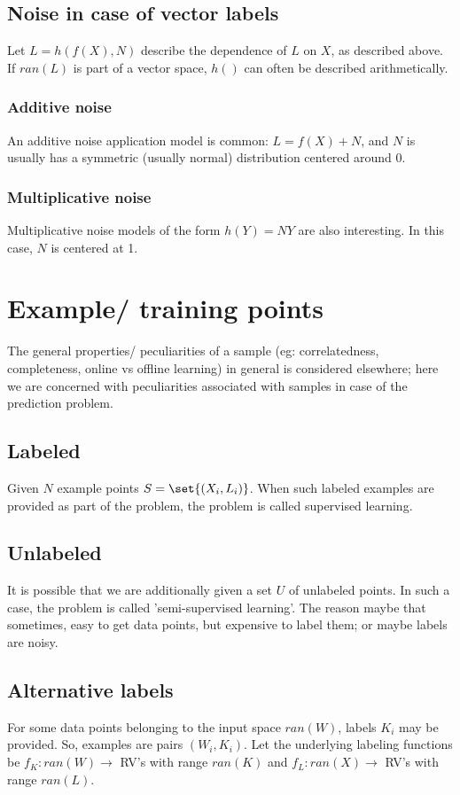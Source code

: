 \documentclass[oneside, article]{memoir}
\begin{document}
\subsection{Noise in case of vector labels}
Let $L = h(f(X), N)$ describe the dependence of $L$ on $X$, as described above. If $ran(L)$ is part of a vector space, $h()$ can often be described arithmetically.

\subsubsection{Additive noise}
An additive noise application model is common: $L = f(X) + N$, and $N$ is usually has a symmetric (usually normal) distribution centered around $0$.

\subsubsection{Multiplicative noise}
Multiplicative noise models of the form $h(Y) = NY$ are also interesting. In this case, $N$ is centered at 1.

\section{Example/ training points}
The general properties/ peculiarities of a sample (eg: correlatedness, completeness, online vs offline learning) in general is considered elsewhere; here we are concerned with peculiarities associated with samples in case of the prediction problem.

\subsection{Labeled}
Given $N$ example points $S = \set{(X_{i}, L_{i})}$. When such labeled examples are provided as part of the problem, the problem is called supervised learning.

\subsection{Unlabeled}
It is possible that we are additionally given a set $U$ of unlabeled points. In such a case, the problem is called 'semi-supervised learning'. The reason maybe that sometimes, easy to get data points, but expensive to label them; or maybe labels are noisy.

\subsection{Alternative labels}
For some data points belonging to the input space $ran(W)$, labels $K_i$ may be provided. So, examples are pairs $(W_i, K_i)$. Let the underlying labeling functions be $f_K: ran(W) \to$ RV's with range $ran(K)$ and $f_L: ran(X) \to $ RV's with range $ran(L)$.
\end{document}
